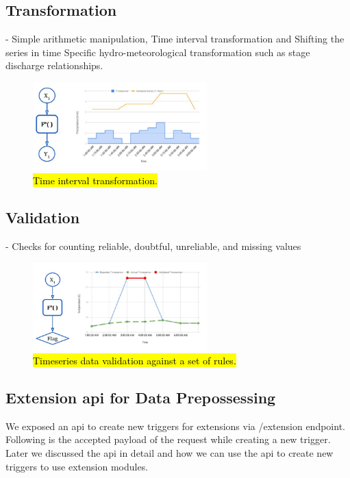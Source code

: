\subsection{Transformation}- Simple arithmetic manipulation, Time interval transformation and Shifting the series in time Specific hydro-meteorological transformation such as stage discharge relationships.
\begin{figure}[htp]
    \centering
    \includegraphics[width=0.6\textwidth]{method/data_preprocess/transformation.jpg}
    \caption{\hl{Time interval transformation.}}
    \label{fi:transformation}
\end{figure}

\subsection{Validation}- Checks for counting reliable, doubtful, unreliable, and missing values
\begin{figure}[htp]
    \centering
    \includegraphics[width=0.6\textwidth]{method/data_preprocess/validation.jpg}
    \caption{\hl{Timeseries data validation against a set of rules.}}
    \label{fi:validation}
\end{figure}

\subsection{Extension \acrfull{api} for Data Prepossessing}

We exposed an \acrshort{api} to create new triggers for extensions via /extension endpoint. Following is the accepted payload of the request while creating a new trigger. Later we discussed the \acrshort{api} in detail and how we can use the \acrshort{api} to create new triggers to use extension modules.

